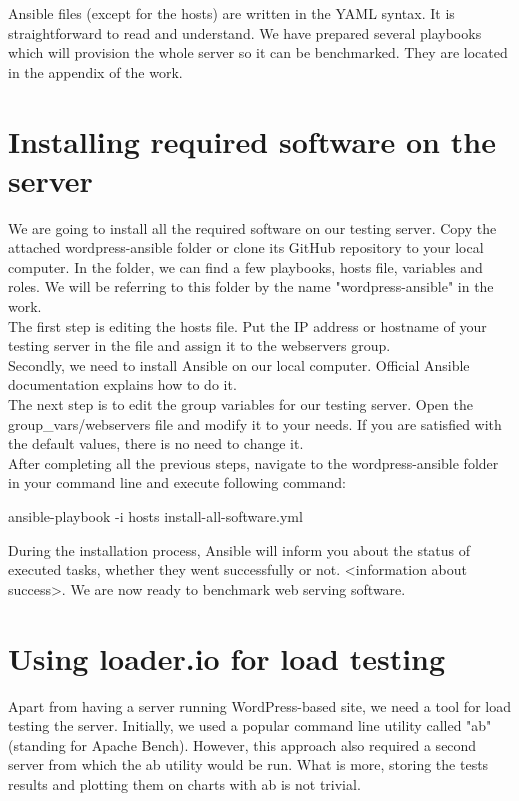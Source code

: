 Ansible files (except for the hosts) are written in the YAML syntax. It is straightforward to read and understand. We have prepared several playbooks which will provision the whole server so it can be benchmarked. They are located in the appendix of the work.

\section{Installing required software on the server}

We are going to install all the required software on our testing server. Copy the attached wordpress-ansible folder or clone its GitHub \cite{GitHub:WordPress-Ansible} repository to your local computer. In the folder, we can find a few playbooks, hosts file, variables and roles. We will be referring to this folder by the name "wordpress-ansible" in the work. \\

The first step is editing the hosts file. Put the IP address or hostname of your testing server in the file and assign it to the webservers group. \\

Secondly, we need to install Ansible on our local computer. Official Ansible documentation \cite{Ansible:install} explains how to do it. \\

The next step is to edit the group variables for our testing server. Open the group\_vars/webservers file and modify it to your needs. If you are satisfied with the default values, there is no need to change it. \\

After completing all the previous steps, navigate to the wordpress-ansible folder in your command line and execute following command:

ansible-playbook -i hosts install-all-software.yml

During the installation process, Ansible will inform you about the status of executed tasks, whether they went successfully or not. <information about success>. We are now ready to benchmark web serving software.

\section{Using loader.io for load testing}

Apart from having a server running WordPress-based site, we need a tool for load testing the server. Initially, we used a popular command line utility called "ab" (standing for Apache Bench). However, this approach also required a second server from which the ab utility would be run. What is more, storing the tests results and plotting them on charts with ab is not trivial. \\

